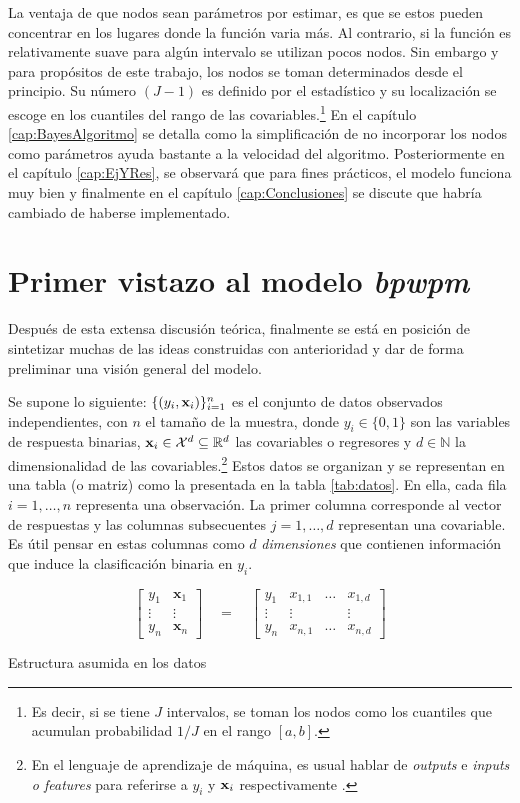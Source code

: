 \documentclass[../Main/Main.tex]{subfiles}
\begin{document}
La ventaja de que nodos sean parámetros por estimar, es que se estos pueden concentrar en los lugares donde la función varia más. Al contrario, si la función es relativamente suave para algún intervalo se utilizan pocos nodos. Sin embargo y para propósitos de este trabajo, los nodos se toman determinados desde el principio. Su número $(J-1)$ es definido por el estadístico y su localización se escoge en los cuantiles del rango de las covariables.\footnote{Es decir, si se tiene $J$ intervalos, se toman los nodos como los  cuantiles que acumulan probabilidad $1/J$ en el rango $[a,b]$.} En el capítulo \ref{cap:BayesAlgoritmo} se detalla como la simplificación de no incorporar los nodos como parámetros ayuda bastante a la velocidad del algoritmo. Posteriormente en el capítulo \ref{cap:EjYRes}, se observará que para fines prácticos, el modelo funciona muy bien y finalmente en el capítulo \ref{cap:Conclusiones} se discute que habría cambiado de haberse implementado. 

\section{Primer vistazo al modelo \textit{bpwpm}} \label{sec:PrimerVistazo}
Después de esta extensa discusión teórica, finalmente se está en posición de sintetizar muchas de las ideas construidas con anterioridad y dar de forma preliminar una visión general del modelo.

Se supone lo siguiente: $\{(y_i,\mathbf{x}_i)\}_{i = 1}^n$ es el conjunto de datos observados independientes, con $n$ el tamaño de la muestra, donde $y_i \in \{0,1\}$ son las variables de respuesta binarias, $\mathbf{x}_i \in \mathcal{X}^d \subseteq \mathbb{R}^d$ las covariables o regresores y $d \in \mathbb{N}$ la dimensionalidad de las covariables.\footnote{En el lenguaje de aprendizaje de máquina, es usual hablar de \textit{outputs} e \textit{inputs o features} para referirse a $y_i$ y $\mathbf{x}_i$ respectivamente \autocite{alpaydin2014introduction}.} Estos datos se organizan y se representan en una tabla (o matriz) como la presentada en la tabla \ref{tab:datos}. En ella, cada fila $i = 1,\ldots,n$ representa una observación. La primer columna corresponde al vector de respuestas y las columnas subsecuentes $j = 1,\ldots,d$ representan una covariable. Es útil pensar en estas columnas como $d$ \textit{dimensiones} que contienen información que induce la clasificación binaria en $y_i$.

\begin{table}[h]
$$
\left[\begin{array}{c|c} 
y_1 & \mathbf{x}_1 \\ 
\vdots & \vdots \\ 
y_n & \mathbf{x}_n \end{array}\right] 
\quad = \quad
\left[\begin{array}{c|ccc} 
y_1 & x_{1,1} & \ldots & x_{1,d} \\ 
\vdots & \vdots & ~ & \vdots \\ 
y_n & x_{n,1} & \ldots & x_{n,d}
\end{array}\right]
$$
\caption{Estructura asumida en los datos}
\label{tab:datos}
\end{table}
\end{document}
